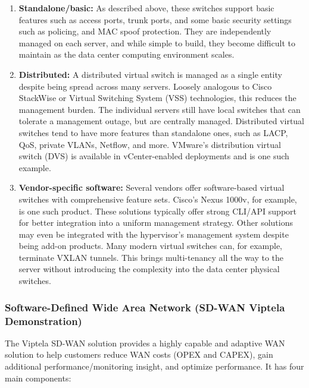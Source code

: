 \begin{enumerate}
  \item \textbf{Standalone/basic:} As described above, these switches support
  basic features such as access ports, trunk ports, and some basic security
  settings such as policing, and MAC spoof protection. They are independently
  managed on each server, and while simple to build, they become difficult to
  maintain as the data center computing environment scales.
  \item \textbf{Distributed:} A distributed virtual switch is managed as a
  single entity despite being spread across many servers. Loosely analogous to
  Cisco StackWise or Virtual Switching System (VSS) technologies, this reduces
  the management burden. The individual servers still have local switches that
  can tolerate a management outage, but are centrally managed. Distributed
  virtual switches tend to have more features than standalone ones, such as
  LACP, QoS, private VLANs, Netflow, and more. VMware's distribution virtual
  switch (DVS) is available in vCenter-enabled deployments and is one such example.
  \item \textbf{ Vendor-specific software:} Several vendors offer
  software-based virtual switches with comprehensive feature sets. Cisco's
  Nexus 1000v, for example, is one such product. These solutions typically
  offer strong CLI/API support for better integration into a uniform
  management strategy. Other solutions may even be integrated with the
  hypervisor's management system despite being add-on products. Many modern
  virtual switches can, for example, terminate VXLAN tunnels. This brings
  multi-tenancy all the way to the server without introducing the complexity
  into the data center physical switches.
\end{enumerate}

\subsubsection{Software-Defined Wide Area Network (SD-WAN Viptela Demonstration)}
The Viptela SD-WAN solution provides a highly capable and adaptive WAN
solution to help customers reduce WAN costs (OPEX and CAPEX), gain additional
performance/monitoring insight, and optimize performance. It has four main
components:

